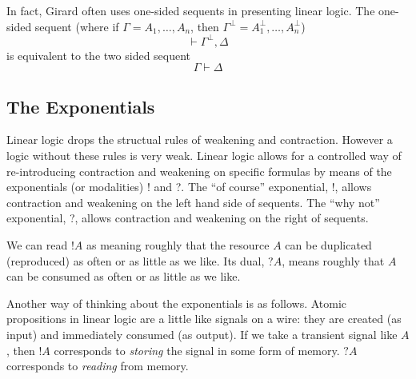 In fact, Girard often uses one-sided sequents in presenting linear logic.
The one-sided sequent 
(where if $\Gamma = A_1,\ldots,A_n$, then $\Gamma^{\bot} = 
A_1^{\bot},\ldots,A_n^{\bot}$)
\[\vdash \Gamma^{\bot},\Delta\]
 is equivalent to the two sided sequent
\[\Gamma\vdash\Delta\]

\subsection{The Exponentials}
Linear logic drops the structual rules of weakening and contraction.
However a logic without these rules is very weak. Linear logic allows
for a controlled way of re-introducing contraction and weakening on
specific formulas by means of the exponentials (or modalities) ! and ?.
The ``of course'' exponential, !, allows contraction
and weakening on the left hand side of sequents.   
The ``why not'' exponential, ?, allows contraction and weakening on the 
right of sequents.

We can read $!A$ as meaning roughly that the resource $A$ can be duplicated
(reproduced) as often or as little as we like.  Its dual, $?A$, means 
roughly that $A$ can be consumed as often or as little as we like.

Another way of thinking about the exponentials is as follows.  Atomic
propositions in linear logic are a little like signals on a wire: they
are created (as input) and immediately consumed (as output).  
If we take a transient signal like
$A$, then $!A$ corresponds to {\em storing} the signal in some form of memory.
$?A$ corresponds to {\em reading} from memory.

